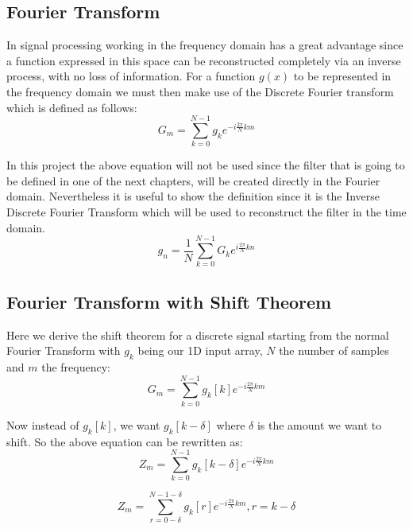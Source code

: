 \documentclass[]{usiinfbachelorproject}
\begin{document}
	\subsection{Fourier Transform}
	In signal processing working in the frequency domain has a great advantage since a function expressed in this space can be reconstructed completely via an inverse process, with no loss of information.\cite{image_book}
	For a function $g(x)$ to be represented in the frequency domain we must then make use of the Discrete Fourier transform which is defined as follows:
	\begin{equation}
		G_m = \displaystyle\sum_{k=0}^{N-1}g_ke^{-i \frac{2\pi}{N}km}
	\end{equation}
	
	In this project the above equation will not be used since the filter that is going to be defined in one of the next chapters, will be created directly in the Fourier domain. Nevertheless it is useful to show the definition since it is the Inverse Discrete Fourier Transform which will be used to reconstruct the filter in the time domain. 
	\begin{equation}
		g_n = \frac{1}{N}\displaystyle\sum_{k=0}^{N-1}G_ke^{i \frac{2\pi}{N}kn}
	\end{equation}
	
	
	\subsection{Fourier Transform with Shift Theorem}
	Here we derive the shift theorem for a discrete signal starting from the normal Fourier Transform with $g_k$ being our 1D input array, $N$ the number of samples and $m$ the frequency:
	\begin{equation*}
		G_m = \displaystyle\sum_{k=0}^{N-1}g_k[k]e^{-i \frac{2\pi}{N} km}
	\end{equation*}
	
	Now instead of $g_k[k]$, we want $g_k[k - \delta]$ where $\delta$ is the amount we want to shift.
	So the above equation can be rewritten as:
	\begin{equation*}
		Z_m = \displaystyle\sum_{k=0}^{N-1}g_k[k - \delta]e^{-i \frac{2\pi}{N} km}
	\end{equation*}
	
	\begin{equation*}
		Z_m = \displaystyle\sum_{r = 0 - \delta}^{N-1-\delta}g_k[r]e^{-i \frac{2\pi}{N} km}, r = k - \delta 
	\end{equation*}
	
\end{document}

